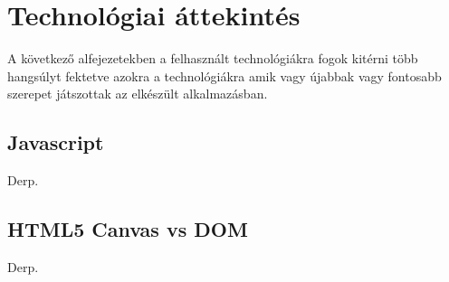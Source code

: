 



\chapter{Technológiai áttekintés}
A következő alfejezetekben a felhasznált technológiákra fogok kitérni több hangsúlyt fektetve azokra a technológiákra amik vagy újabbak vagy fontosabb szerepet játszottak az elkészült alkalmazásban.


\section{Javascript}
Derp.

\section{HTML5 Canvas vs DOM}
Derp.















